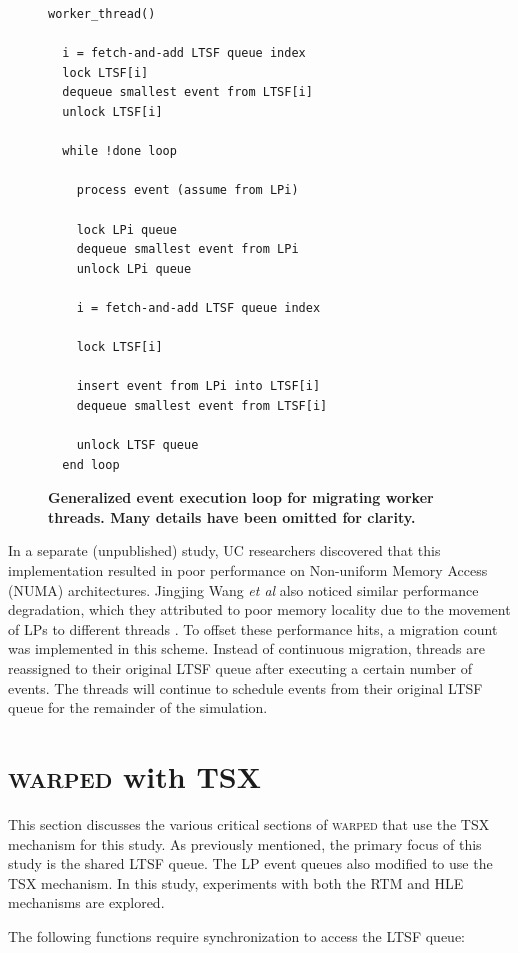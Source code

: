 \documentclass{sig-alternate}
\begin{document}
\begin{figure}
\begin{verbatim}
worker_thread()

  i = fetch-and-add LTSF queue index
  lock LTSF[i]
  dequeue smallest event from LTSF[i]
  unlock LTSF[i]

  while !done loop

    process event (assume from LPi)

    lock LPi queue
    dequeue smallest event from LPi
    unlock LPi queue

    i = fetch-and-add LTSF queue index

    lock LTSF[i]

    insert event from LPi into LTSF[i]
    dequeue smallest event from LTSF[i]

    unlock LTSF queue
  end loop
\end{verbatim}
\caption{\textbf{Generalized event execution loop for migrating worker threads.  Many
    details have been omitted for clarity.}}\label{migratinWorkerThreadAlgorithm}
\end{figure}

In a separate (unpublished) study, UC researchers discovered that this implementation
resulted in poor performance on Non-uniform Memory Access (NUMA) architectures.  Jingjing
Wang \emph{et al} also noticed similar performance degradation, which they attributed to
poor memory locality due to the movement of LPs to different threads \cite{numa}.  To
offset these performance hits, a migration count was implemented in this scheme.  Instead
of continuous migration, threads are reassigned to their original LTSF queue after
executing a certain number of events.  The threads will continue to schedule events from
their original LTSF queue for the remainder of the simulation.

\section{\textsc{warped} with TSX}\label{tsx}

This section discusses the various critical sections of \textsc{warped} that use the TSX
mechanism for this study.  As previously mentioned, the primary focus of this study is the
shared LTSF queue.  The LP event queues also modified to use the TSX mechanism.  In
this study, experiments with both the RTM and HLE mechanisms are explored.

The following functions require synchronization to access the LTSF queue:
\end{document}
